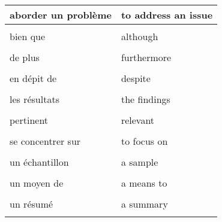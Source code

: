 \documentclass[
  10pt,
]{article}
\begin{document}
\begin{longtable}{ll}
\toprule
aborder un problème & to address an issue\\
\midrule
\cellcolor{gray!6}{augmenter} & \cellcolor{gray!6}{to increase}\\

bien que & although\\

\cellcolor{gray!6}{dans quelle mesure} & \cellcolor{gray!6}{to what extent}\\

de plus & furthermore\\

\cellcolor{gray!6}{dès le départ} & \cellcolor{gray!6}{right off the bat}\\

en dépit de & despite\\

\cellcolor{gray!6}{exécution, mise en œuvre} & \cellcolor{gray!6}{implementation}\\

les résultats & the findings\\

\cellcolor{gray!6}{mettre à nu} & \cellcolor{gray!6}{to lay bare}\\

pertinent & relevant\\

\cellcolor{gray!6}{puisque} & \cellcolor{gray!6}{since}\\

se concentrer sur & to focus on\\

\cellcolor{gray!6}{un but (p...)} & \cellcolor{gray!6}{a purpose}\\

un échantillon & a sample\\

\cellcolor{gray!6}{une tendance} & \cellcolor{gray!6}{a trend}\\

un moyen de & a means to\\

\cellcolor{gray!6}{un résultat (o...)} & \cellcolor{gray!6}{an outcome}\\

un résumé & a summary\\

\cellcolor{gray!6}{viser à, avoir pour but de} & \cellcolor{gray!6}{to aim to}\\
\bottomrule
\end{longtable}
\end{document}
